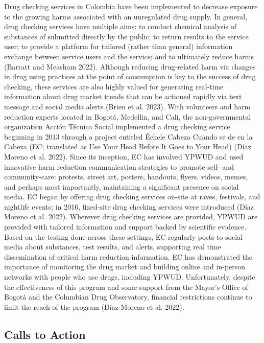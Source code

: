 \documentclass[
  letterpaper,
  DIV=11,
  numbers=noendperiod]{scrartcl}
\begin{document}
Drug checking services in Colombia have been implemented to decrease
exposure to the growing harms associated with an unregulated drug
supply. In general, drug checking services have multiple aims: to
conduct chemical analysis of substances of submitted directly by the
public; to return results to the service user; to provide a platform for
tailored (rather than general) information exchange between service
users and the service; and to ultimately reduce harms (Barratt and
Measham 2022). Although reducing drug-related harm via changes in drug
using practices at the point of consumption is key to the success of
drug checking, these services are also highly valued for generating
real-time information about drug market trends that can be actioned
rapidly via text message and social media alerts (Brien et al. 2023).
With volunteers and harm reduction experts located in Bogotá, Medellin,
and Cali, the non-governmental organization Acción Técnica Social
implemented a drug checking service beginning in 2013 through a project
entitled Échele Cabeza Cuando se de en la Cabeza (EC; translated as Use
Your Head Before It Goes to Your Head) (Díaz Moreno et al. 2022). Since
its inception, EC has involved YPWUD and used innovative harm reduction
communication strategies to promote self- and community-care: protests,
street art, posters, handouts, flyers, videos, memes, and perhaps most
importantly, maintaining a significant presence on social media. EC
began by offering drug checking services on-site at raves, festivals,
and nightlife events; in 2016, fixed-site drug checking services were
introduced (Díaz Moreno et al. 2022). Wherever drug checking services
are provided, YPWUD are provided with tailored information and support
backed by scientific evidence. Based on the testing done across these
settings, EC regularly posts to social media about substances, test
results, and alerts, supporting real time dissemination of critical harm
reduction information. EC has demonstrated the importance of monitoring
the drug market and building online and in-person networks with people
who use drugs, including YPWUD. Unfortunately, despite the effectiveness
of this program and some support from the Mayor's Office of Bogotá and
the Columbian Drug Observatory, financial restrictions continue to limit
the reach of the program (Díaz Moreno et al. 2022).

\subsection{Calls to Action}\label{calls-to-action}
\end{document}
